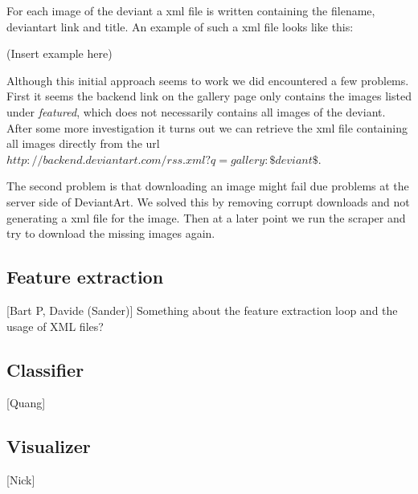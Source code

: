 For each image of the deviant a xml file is written containing the filename, deviantart link and title.
An example of such a xml file looks like this:

(Insert example here)

Although this initial approach seems to work we did encountered a few problems. First it
seems the backend link on the gallery page only contains the images listed under \textit{featured}, 
which does not necessarily contains all images of the deviant. After some more investigation it turns 
out we can retrieve the xml file containing all images directly from the url 
\textit{$http://backend.deviantart.com/rss.xml?q=gallery:\$deviant\$$}.

The second problem is that downloading an image might fail due problems at the server side of DeviantArt.
We solved this by removing corrupt downloads and not generating a xml file for the image. Then at a later
point we run the scraper and try to download the missing images again. 


\subsection{Feature extraction}
[Bart P, Davide (Sander)]
Something about the feature extraction loop and the usage of XML files?
\subsection{Classifier}
[Quang]
\subsection{Visualizer}
[Nick]
